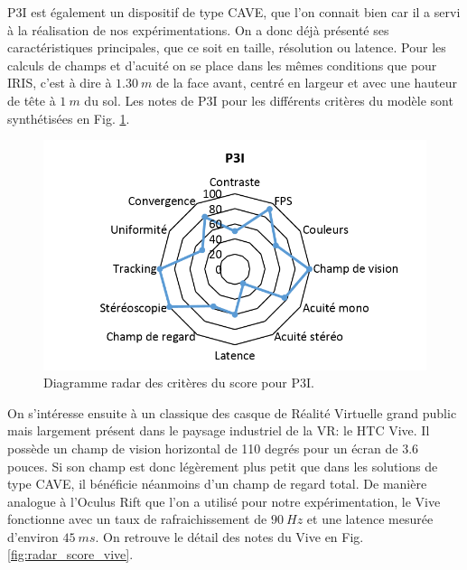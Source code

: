 \par P3I est également un dispositif de type CAVE, que l'on connait bien car il a servi à la réalisation de nos expérimentations. On a donc déjà présenté ses caractéristiques principales, que ce soit en taille, résolution ou latence. Pour les calculs de champs et d'acuité on se place dans les mêmes conditions que pour IRIS, c'est à dire à $1.30~m$ de la face avant, centré en largeur et avec une hauteur de tête à $1~m$ du sol. Les notes de P3I pour les différents critères du modèle sont synthétisées en Fig. \ref{fig:radar_score_p3i}.

\begin{figure}[h]
	\centering
	\includegraphics[scale=1]{Figures/RadarScoreP3I}
	\caption{Diagramme radar des critères du score pour P3I.}
	\label{fig:radar_score_p3i}
\end{figure}

\par On s'intéresse ensuite à un classique des casque de Réalité Virtuelle grand public mais largement présent dans le paysage industriel de la VR: le HTC Vive. Il possède un champ de vision horizontal de 110 degrés pour un écran de 3.6 pouces. Si son champ est donc légèrement plus petit que dans les solutions de type CAVE, il bénéficie néanmoins d'un champ de regard total. De manière analogue à l'Oculus Rift que l'on a utilisé pour notre expérimentation, le Vive fonctionne avec un taux de rafraichissement de $90~Hz$ et une latence mesurée d'environ $45~ms$. On retrouve le détail des notes du Vive en Fig. \ref{fig:radar_score_vive}.

